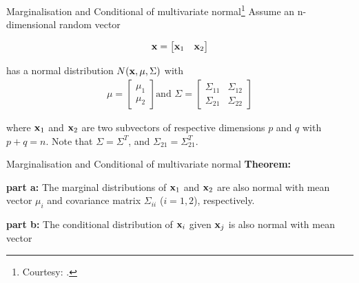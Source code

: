 \documentclass{beamer}
\begin{document}
\begin{frame}{Marginalisation and Conditional of multivariate normal\footnote{Courtesy: \nodeSeven.}}
Assume an n-dimensional random vector

\begin{equation}
	{\bf x}=\begin{bmatrix}{\bf x}_1 & {\bf x}_2\end{bmatrix} 
\end{equation}

has a normal distribution $N({\bf x},\mu,\Sigma)$ with
\begin{gather}\mu=
	\begin{bmatrix}
		\mu_1 \\
		\mu_2
	\end{bmatrix} 
	\text{and }
	\Sigma = \begin{bmatrix}
		\Sigma_{11}& \Sigma_{12}\\
		\Sigma_{21}&\Sigma_{22}
	\end{bmatrix} 
\end{gather}

where ${\bf x}_1$ and ${\bf x}_2$ are two subvectors of respective dimensions $p$ and $q$ with $p+q=n$. Note that $\Sigma=\Sigma^T$, and $\Sigma_{21}=\Sigma_{21}^T$.
\end{frame}

\begin{frame}{Marginalisation and Conditional of multivariate normal}
\textbf{Theorem:}

\textbf{part a:} The marginal distributions of ${\bf x}_1$ and ${\bf x}_2$ are also normal with mean vector $\mu_i$ and covariance matrix $\Sigma_{ii}$ ($i=1,2$), respectively.

\textbf{part b:} The conditional distribution of ${\bf x}_i$ given ${\bf x}_j$ is also normal with mean vector

\end{frame}
\end{document}
